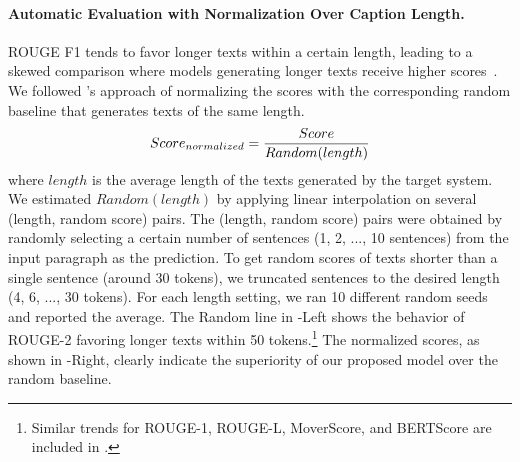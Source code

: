\paragraph{Automatic Evaluation with Normalization Over Caption Length.}
ROUGE F1 tends to favor longer texts within a certain length, leading to a skewed comparison where models generating longer texts receive higher scores~\cite{sun-etal-2019-compare}.
We followed \citet{sun-etal-2019-compare}'s approach of normalizing the scores 
with the corresponding random baseline that generates texts of the same length. 
\begin{equation}
    \small
    Score_{normalized} = \frac{Score}{Random(length)}
\end{equation}
where $length$ is the average length of the texts generated by the target system.
We estimated $Random(length)$ by applying linear interpolation on several (length, random score) pairs.
The (length, random score) pairs were obtained by randomly selecting a certain number of sentences (1, 2, ..., 10 sentences) from the input paragraph as the prediction. 
To get random scores of texts shorter than a single sentence (around 30 tokens), 
we truncated sentences to the desired length (4, 6, ..., 30 tokens). 
For each length setting, we ran 10 different random seeds and reported the average. 
The Random line in -Left shows the behavior of ROUGE-2
favoring longer texts within 50 tokens.\footnote{Similar trends for ROUGE-1, ROUGE-L, MoverScore, and BERTScore 
are included in .}
The normalized scores, as shown in -Right, 
clearly indicate the superiority of our proposed model over the random baseline.


